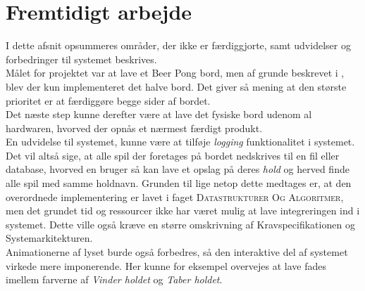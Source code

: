 \documentclass[Rapport/Rapport_main.tex]{subfiles}
\begin{document}
\section{Fremtidigt arbejde}
I dette afsnit opsummeres områder, der ikke er færdiggjorte, samt udvidelser og forbedringer til systemet beskrives.\\
Målet for projektet var at lave et Beer Pong bord, men af grunde beskrevet i , blev der kun implementeret det halve bord. Det giver så mening at den største prioritet er at færdiggøre begge sider af bordet.\\
Det næste step kunne derefter være at lave det fysiske bord udenom al hardwaren, hvorved der opnås et nærmest færdigt produkt.\\

En udvidelse til systemet, kunne være at tilføje \textit{logging} funktionalitet i systemet. Det vil altså sige, at alle spil der foretages på bordet nedskrives til en fil eller database, hvorved en bruger så kan lave et opslag på deres \textit{hold} og herved finde alle spil med samme holdnavn. Grunden til lige netop dette medtages er, at den overordnede implementering er lavet i faget \textsc{Datastrukturer Og Algoritmer}, men det grundet tid og ressourcer ikke har været mulig at lave integreringen ind i systemet. Dette ville også kræve en større omskrivning af Kravspecifikationen og Systemarkitekturen.\\

Animationerne af lyset burde også forbedres, så den interaktive del af systemet virkede mere imponerende. Her kunne for eksempel overvejes at lave fades imellem farverne af \textit{Vinder holdet} og \textit{Taber holdet}.
\end{document}
